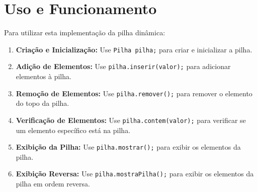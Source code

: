 \documentclass[a4paper,12pt]{article}
\begin{document}
\section{Uso e Funcionamento}
Para utilizar esta implementação da pilha dinâmica:
\begin{enumerate}
    \item \textbf{Criação e Inicialização:} Use \texttt{Pilha pilha;} para criar e inicializar a pilha.
    \item \textbf{Adição de Elementos:} Use \texttt{pilha.inserir(valor);} para adicionar elementos à pilha.
    \item \textbf{Remoção de Elementos:} Use \texttt{pilha.remover();} para remover o elemento do topo da pilha.
    \item \textbf{Verificação de Elementos:} Use \texttt{pilha.contem(valor);} para verificar se um elemento específico está na pilha.
    \item \textbf{Exibição da Pilha:} Use \texttt{pilha.mostrar();} para exibir os elementos da pilha.
    \item \textbf{Exibição Reversa:} Use \texttt{pilha.mostraPilha();} para exibir os elementos da pilha em ordem reversa.
\end{enumerate}
\end{document}
